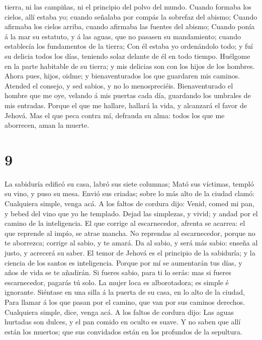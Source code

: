 tierra, ni las campiñas, ni el principio del polvo del mundo.
 Cuando formaba los cielos, allí estaba yo; cuando
señalaba por compás la sobrefaz del abismo;  Cuando
afirmaba los cielos arriba, cuando afirmaba las fuentes del abismo;
 Cuando ponía á la mar su estatuto, y á las aguas, que no
pasasen su mandamiento; cuando establecía los fundamentos de la tierra;
 Con él estaba yo ordenándolo todo; y fuí su delicia
todos los días, teniendo solaz delante de él en todo tiempo.
 Huélgome en la parte habitable de su tierra; y mis
delicias son con los hijos de los hombres.  Ahora pues,
hijos, oidme; y bienaventurados los que guardaren mis caminos.
 Atended el consejo, y sed sabios, y no lo menospreciéis.
 Bienaventurado el hombre que me oye, velando á mis
puertas cada día, guardando los umbrales de mis entradas.
 Porque el que me hallare, hallará la vida, y alcanzará
el favor de Jehová.  Mas el que peca contra mí, defrauda
su alma: todos los que me aborrecen, aman la muerte.

\hypertarget{section-8}{%
\section{9}\label{section-8}}

 La sabiduría edificó su casa, labró sus siete columnas;
 Mató sus víctimas, templó su vino, y puso su mesa.
 Envió sus criadas; sobre lo más alto de la ciudad clamó:
 Cualquiera simple, venga acá. A los faltos de cordura
dijo:  Venid, comed mi pan, y bebed del vino que yo he
templado.  Dejad las simplezas, y vivid; y andad por el
camino de la inteligencia.  El que corrige al
escarnecedor, afrenta se acarrea: el que reprende al impío, se atrae
mancha.  No reprendas al escarnecedor, porque no te
aborrezca; corrige al sabio, y te amará.  Da al sabio, y
será más sabio: enseña al justo, y acrecerá su saber.  El
temor de Jehová es el principio de la sabiduría; y la ciencia de los
santos es inteligencia.  Porque por mí se aumentarán tus
días, y años de vida se te añadirán.  Si fueres sabio,
para ti lo serás: mas si fueres escarnecedor, pagarás tú solo.
 La mujer loca es alborotadora; es simple é ignorante.
 Siéntase en una silla á la puerta de su casa, en lo alto
de la ciudad,  Para llamar á los que pasan por el camino,
que van por sus caminos derechos.  Cualquiera simple,
dice, venga acá. A los faltos de cordura dijo:  Las aguas
hurtadas son dulces, y el pan comido en oculto es suave. 
Y no saben que allí están los muertos; que sus convidados están en los
profundos de la sepultura.

